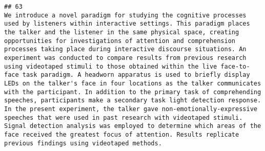 \documentclass[
  english,
  man]{apa6}
\begin{document}
\begin{verbatim}
## 63                                                                                                                                                                                                                                                                                                                                                                                                                                                                                                                                                                                                                                                                                                                                                                                                                                                                                                                                                                                                                                                                                                                                                                                                                                                                                                                                                                                                                                                                                                                                                                     We introduce a novel paradigm for studying the cognitive processes used by listeners within interactive settings. This paradigm places the talker and the listener in the same physical space, creating opportunities for investigations of attention and comprehension processes taking place during interactive discourse situations. An experiment was conducted to compare results from previous research using videotaped stimuli to those obtained within the live face-to-face task paradigm. A headworn apparatus is used to briefly display LEDs on the talker's face in four locations as the talker communicates with the participant. In addition to the primary task of comprehending speeches, participants make a secondary task light detection response. In the present experiment, the talker gave non-emotionally-expressive speeches that were used in past research with videotaped stimuli. Signal detection analysis was employed to determine which areas of the face received the greatest focus of attention. Results replicate previous findings using videotaped methods.

\end{verbatim}
\end{document}
